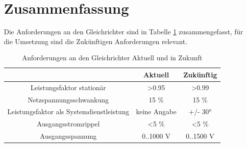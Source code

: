 \section{Zusammenfassung}
Die Anforderungen an den Gleichrichter sind in Tabelle \ref{tab:AnfZsm} zusammengefasst, für die Umsetzung sind die Zukünftigen Anforderungen relevant. \\
\begin{table}
	\centering
\caption{Anforderungen an den Gleichrichter Aktuell und in Zukunft}
\label{tab:AnfZsm}
\begin{tabular}{c|c|c}
	& Aktuell & Zukünftig \\
	\hline
	Leistungsfaktor stationär & >0.95 & >0.99 \\
	\hline
	Netzspannungsschwankung & 15 \% & 15 \% \\
	\hline
	Leistungsfaktor als Systemdienstleistung & keine Angabe & +/- 30° \\
	\hline
	Ausgangsstromrippel & <5 \% & <5 \% \\
	\hline
	Ausgangsspannung & 0..1000 V & 0..1500 V \\

\end{tabular}
\end{table}

